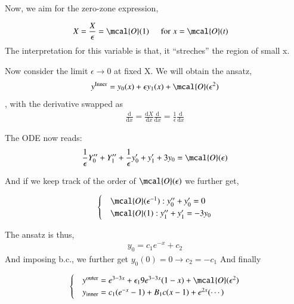 \documentclass[a4paper, 12pt]{article}
\begin{document}
Now, we aim for the zero-zone expression, 

\begin{align}
  \label{new variable}
  X &= \frac{X}{\epsilon} = \mcal{O}(1) \hspace{0.5cm}
  \mathrm{for} \hspace{0.1cm} x = \mcal{O}(t)
\end{align}
The interpretation for this variable is that, it \enquote{streches} the region of small x. 

Now consider the limit \( \epsilon \to 0 \) at fixed X. 
We will obtain the ansatz, 
\begin{align}
  \label{inner field expansion}
  y^{\mathrm{Inner}} = y_0(x) + \epsilon y_{1}(x) +
  \mcal{O}(\epsilon^2)  
\end{align}, with the  derivative swapped as 
\begin{align}
  \label{yep}
  \frac{\mathrm{d}}{\mathrm{d}x} =
\frac{\mathrm{d}X}{\mathrm{d}x} \frac{\mathrm{d}}{\mathrm{d}x} =
\frac{1}{\epsilon} \frac{\mathrm{d}}{\mathrm{d}x} 
\end{align}

The ODE now reads: 
\begin{align}
  \label{reads}
  \frac{1}{\epsilon} Y_{0}^{\prime \prime} + Y_{1}^{\prime \prime} +
  \frac{1}{\epsilon} y_{0}^{\prime} + y_{1}^{\prime} + 3 y_{0} =
  \mcal{O}(\epsilon)
\end{align}

And if we keep track of the order of \( \mcal{O}(\epsilon) \) we further get, 


\begin{align}
  \label{zero zone approx}
  \begin{cases} 
    &\mcal{O}(\epsilon^{-1}):  y_{0}^{\prime \prime} +
    y_{0}^{\prime} = 0 \\ 
    &\mcal{O}(1): y_{1}^{\prime \prime} + y_{1}^{\prime} = - 3 y_{0}
  \end{cases}
\end{align}

The ansatz is thus, 
\begin{align}
  \label{zero-zone ansatz}
  y_{0} = c_1 e^{-x} + c_2  
\end{align}
And imposing b.c., we further get \( y_0(0) = 0 \to c_2 = -c_1 \)
And finally 

\begin{align}
  \label{final outer inner}
  \begin{cases} 
    &y^{\mathrm{outer}} = e^{3-3x} + \epsilon_1 9 e^{3-3x} (1-x) +
    \mcal{O}(\epsilon^2) \\ 
    &y_{\mathrm{inner}} = c_1 (e^{-x} - 1 ) + B_1 c (x-1) +
    e^{2x}(\cdots) 
  \end{cases}
\end{align}
\end{document}
